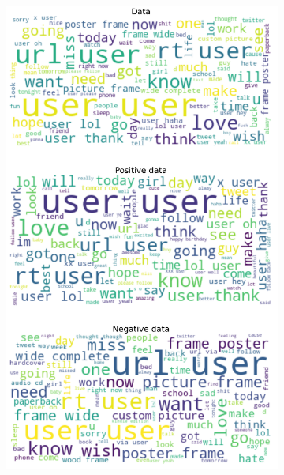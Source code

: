 \documentclass{article}
\begin{document}
\begin{itemize}
\begin{figure}[H]
\centering
\captionsetup{justification=centering}
\begin{subfigure}[b]{0.24\textwidth}
\centering
\includegraphics[width=\textwidth]{chapter-06/section-01-01/10/visualization/1/wordcloud.png}
\end{subfigure}
\begin{subfigure}[b]{0.24\textwidth}
\centering

\end{subfigure}
\end{figure}
\end{itemize}
\end{document}
